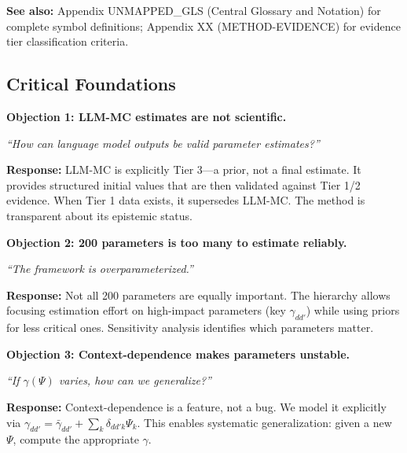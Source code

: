 \textbf{See also:} Appendix UNMAPPED_GLS (Central Glossary and Notation) for complete symbol definitions; Appendix XX (METHOD-EVIDENCE) for evidence tier classification criteria.


\subsection{Critical Foundations}
\label{sec:BBB-foundations}

\begin{tcolorbox}[colback=red!5!white, colframe=red!75!black,
    title=\textbf{Critical Foundations: Objections and Responses}]

\textbf{Objection 1: LLM-MC estimates are not scientific.}

\textit{``How can language model outputs be valid parameter estimates?''}

\textbf{Response:} LLM-MC is explicitly Tier 3---a prior, not a final estimate. It provides
structured initial values that are then validated against Tier 1/2 evidence. When Tier 1
data exists, it supersedes LLM-MC. The method is transparent about its epistemic status.

\medskip

\textbf{Objection 2: 200 parameters is too many to estimate reliably.}

\textit{``The framework is overparameterized.''}

\textbf{Response:} Not all 200 parameters are equally important. The hierarchy allows
focusing estimation effort on high-impact parameters (key $\gamma_{dd'}$) while using
priors for less critical ones. Sensitivity analysis identifies which parameters matter.

\medskip

\textbf{Objection 3: Context-dependence makes parameters unstable.}

\textit{``If $\gamma(\Psi)$ varies, how can we generalize?''}

\textbf{Response:} Context-dependence is a feature, not a bug. We model it explicitly
via $\gamma_{dd'} = \bar{\gamma}_{dd'} + \sum_k \delta_{dd'k} \Psi_k$. This enables
systematic generalization: given a new $\Psi$, compute the appropriate $\gamma$.

\end{tcolorbox}

